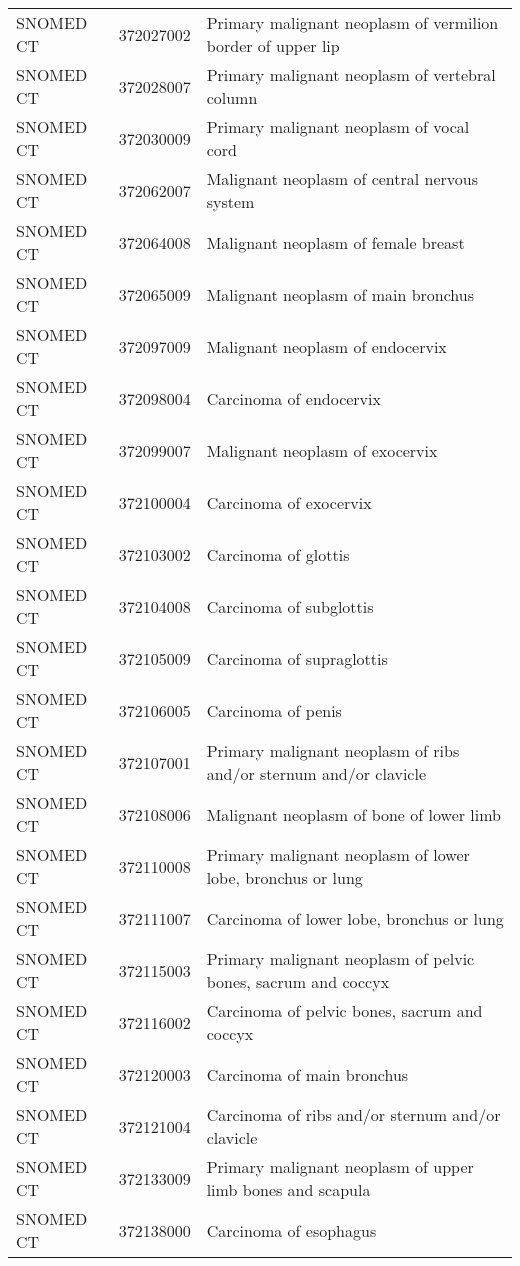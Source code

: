 \begin{longtable}{p{}p{}p{}}
  SNOMED CT & 372027002 & Primary malignant neoplasm of vermilion border of upper lip \\ 
  SNOMED CT & 372028007 & Primary malignant neoplasm of vertebral column \\ 
  SNOMED CT & 372030009 & Primary malignant neoplasm of vocal cord \\ 
  SNOMED CT & 372062007 & Malignant neoplasm of central nervous system \\ 
  SNOMED CT & 372064008 & Malignant neoplasm of female breast \\ 
  SNOMED CT & 372065009 & Malignant neoplasm of main bronchus \\ 
  SNOMED CT & 372097009 & Malignant neoplasm of endocervix \\ 
  SNOMED CT & 372098004 & Carcinoma of endocervix \\ 
  SNOMED CT & 372099007 & Malignant neoplasm of exocervix \\ 
  SNOMED CT & 372100004 & Carcinoma of exocervix \\ 
  SNOMED CT & 372103002 & Carcinoma of glottis \\ 
  SNOMED CT & 372104008 & Carcinoma of subglottis \\ 
  SNOMED CT & 372105009 & Carcinoma of supraglottis \\ 
  SNOMED CT & 372106005 & Carcinoma of penis \\ 
  SNOMED CT & 372107001 & Primary malignant neoplasm of ribs and/or sternum and/or clavicle \\ 
  SNOMED CT & 372108006 & Malignant neoplasm of bone of lower limb \\ 
  SNOMED CT & 372110008 & Primary malignant neoplasm of lower lobe, bronchus or lung \\ 
  SNOMED CT & 372111007 & Carcinoma of lower lobe, bronchus or lung \\ 
  SNOMED CT & 372115003 & Primary malignant neoplasm of pelvic bones, sacrum and coccyx \\ 
  SNOMED CT & 372116002 & Carcinoma of pelvic bones, sacrum and coccyx \\ 
  SNOMED CT & 372120003 & Carcinoma of main bronchus \\ 
  SNOMED CT & 372121004 & Carcinoma of ribs and/or sternum and/or clavicle \\ 
  SNOMED CT & 372133009 & Primary malignant neoplasm of upper limb bones and scapula \\ 
  SNOMED CT & 372138000 & Carcinoma of esophagus \\ 

\end{longtable}
